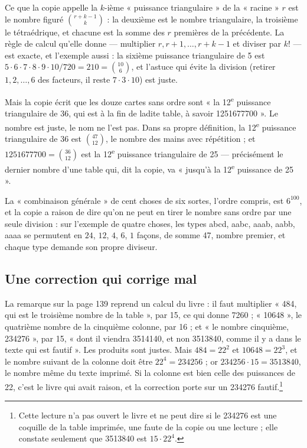 \documentclass[11pt,a4paper]{article}
\begin{document}
Ce que la copie appelle la $k$-ième « puissance triangulaire » de la « racine »
$r$ est le nombre figuré $\binom{r+k-1}{k}$ : la deuxième est le nombre
triangulaire, la troisième le tétraédrique, et chacune est la somme des $r$
premières de la précédente. La règle de calcul qu'elle donne — multiplier
$r, r+1, \dots, r+k-1$ et diviser par $k!$ — est exacte, et l'exemple aussi : la
sixième puissance triangulaire de 5 est $5 \cdot 6 \cdot 7 \cdot 8 \cdot 9
\cdot 10 / 720 = 210 = \binom{10}{6}$, et l'astuce qui évite la division
(retirer $1, 2, \dots, 6$ des facteurs, il reste $7 \cdot 3 \cdot 10$) est juste.

Mais la copie écrit que les douze cartes sans ordre sont « la
12\textsuperscript{e} puissance triangulaire de 36, qui est à la fin de ladite
table, à savoir 1251677700 ». Le nombre est juste, le nom ne l'est pas. Dans sa
propre définition, la 12\textsuperscript{e} puissance triangulaire de 36 est
$\binom{47}{12}$, le nombre des mains avec répétition ; et $1251677700 =
\binom{36}{12}$ est la 12\textsuperscript{e} puissance triangulaire de 25 —
précisément le dernier nombre d'une table qui, dit la copie, va « jusqu'à la
12\textsuperscript{e} puissance de 25 ».

La « combinaison générale » de cent choses de six sortes, l'ordre compris, est
$6^{100}$, et la copie a raison de dire qu'on ne peut en tirer le nombre sans
ordre par une seule division : sur l'exemple de quatre choses, les types abcd,
aabc, aaab, aabb, aaaa se permutent en $24$, $12$, $4$, $6$, $1$ façons, de somme 47,
nombre premier, et chaque type demande son propre diviseur.

\subsection*{Une correction qui corrige mal}

La remarque sur la page 139 reprend un calcul du livre : il faut multiplier
« 484, qui est le troisième nombre de la table », par 15, ce qui donne 7260 ;
« 10648 », le quatrième nombre de la cinquième colonne, par 16 ; et « le
nombre cinquième, 234276 », par 15, « dont il viendra 3514140, et non 3513840,
comme il y a dans le texte qui est fautif ». Les produits sont justes. Mais
$484 = 22^2$ et $10648 = 22^3$, et le nombre suivant de la colonne doit être
$22^4 = 234256$ ; or $234256 \cdot 15 = 3513840$, le nombre même du texte
imprimé. Si la colonne est bien celle des puissances de 22, c'est le livre qui
avait raison, et la correction porte sur un 234276 fautif.\footnote{Cette lecture
n'a pas ouvert le livre et ne peut dire si le 234276 est une coquille de la table
imprimée, une faute de la copie ou une lecture ; elle constate seulement que
3513840 est $15 \cdot 22^4$.}
\end{document}
